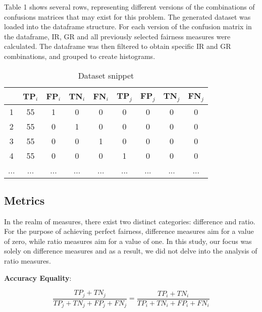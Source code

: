 \documentclass[sn-vancouver]{sn-jnl}%
\theoremstyle{thmstyleone}%
\theoremstyle{thmstyletwo}%
\theoremstyle{thmstylethree}%
\begin{document}
Table 1 shows several rows, representing different versions of the combinations of confusions matrices that may exist for this problem. The generated dataset was loaded into the dataframe structure. For each version of the confusion matrix in the dataframe, IR, GR and all previously selected fairness measures were calculated. The dataframe was then filtered to obtain specific IR and GR combinations, and grouped to create histograms.

\begin{table}[h]
\begin{center}
\begin{minipage}{225pt}
\caption{Dataset snippet}\label{tab1}%
\begin{tabular}{|c|c|c|c|c|c|c|c|c|}
\hline
    & TP$_{i}$ & FP$_{i}$ & TN$_{i}$ & FN$_{i}$ & TP$_{j}$ & FP$_{j}$ & TN$_{j}$ & FN$_{j}$ \\ \hline
1   & 55    & 1     & 0     & 0     & 0     & 0     & 0     & 0     \\ \hline
2   & 55    & 0     & 1     & 0     & 0     & 0     & 0     & 0     \\ \hline
3   & 55    & 0     & 0     & 1     & 0     & 0     & 0     & 0     \\ \hline
4   & 55    & 0     & 0     & 0     & 1     & 0     & 0     & 0     \\ \hline
... & ...   & ...   & ...   & ...   & ...   & ...   & ...   & ...   \\ \hline
\end{tabular}
\end{minipage}
\end{center}
\end{table}

\subsection{Metrics}\label{subsec3}

In the realm of measures, there exist two distinct categories: difference and ratio. For the purpose of achieving perfect fairness, difference measures aim for a value of zero, while ratio measures aim for a value of one. In this study, our focus was solely on difference measures and as a result, we did not delve into the analysis of ratio measures.

\textbf{Accuracy Equality}:

\begin{equation}
\frac{TP_{j} + TN_{j}}{TP_{j} + TN_{j} + FP_{j} + FN_{j}} = \frac{TP_{i} + TN_{i}}{TP_{i} + TN_{i} + FP_{i} + FN_{i}} \label{eq3}
\end{equation}
\end{document}
